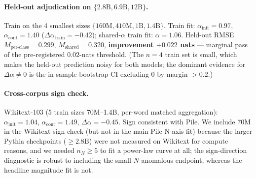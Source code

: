 \documentclass[10pt]{article}
\newcommand{\dalpha}{\Delta\alpha}
\newcommand{\ainit}{\alpha_\mathrm{init}}
\newcommand{\acont}{\alpha_\mathrm{cont}}
\newcommand{\Mp}{M_\mathrm{per\text{-}class}}
\newcommand{\Ms}{M_\mathrm{shared}}
\begin{document}
\paragraph{Held-out adjudication on $\{2.8\text{B}, 6.9\text{B},
12\text{B}\}$.} Train on the 4 smallest sizes
$\{160\text{M}, 410\text{M}, 1\text{B}, 1.4\text{B}\}$. Train fit:
$\ainit = 0.97$, $\acont = 1.40$ ($\dalpha_\mathrm{train} = -0.42$);
shared-$\alpha$ train fit: $\alpha = 1.06$. Held-out RMSE
$\Mp = 0.299$, $\Ms = 0.320$, \textbf{improvement $+0.022$ nats} ---
marginal pass of the pre-registered $0.02$-nats threshold. (The
$n{=}4$ train set is small, which makes the held-out prediction noisy
for both models; the dominant evidence for $\dalpha \neq 0$ is the
in-sample bootstrap CI excluding 0 by margin $> 0.2$.)

\paragraph{Cross-corpus sign check.} Wikitext-103 (5 train sizes
70M--1.4B, per-word matched aggregation): $\ainit = 1.04$,
$\acont = 1.49$, $\dalpha = -0.45$. Sign consistent with Pile.
We include 70M in the Wikitext sign-check (but not in the main Pile
N-axis fit) because the larger Pythia checkpoints ($\geq 2.8\text{B}$)
were not measured on Wikitext for compute reasons, and we needed
$n_N \geq 5$ to fit a power-law curve at all; the sign-direction
diagnostic is robust to including the small-$N$ anomalous endpoint,
whereas the headline magnitude fit is not.
\end{document}
